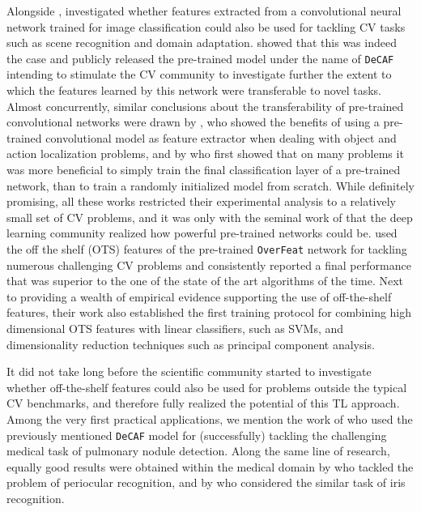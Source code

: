 Alongside \citet{yosinski2014transferable}, \citet{donahue2014decaf} investigated whether features extracted from a convolutional neural network trained for image classification could also be used for tackling CV tasks such as scene recognition and domain adaptation. \citet{donahue2014decaf} showed that this was indeed the case and publicly released the pre-trained model under the name of \texttt{DeCAF} intending to stimulate the CV community to investigate further the extent to which the features learned by this network were transferable to novel tasks. Almost concurrently, similar conclusions about the transferability of pre-trained convolutional networks were drawn by \citet{oquab2014learning}, who showed the benefits of using a pre-trained convolutional model as feature extractor when dealing with object and action localization problems, and by \citet{zeiler2014visualizing} who first showed that on many problems it was more beneficial to simply train the final classification layer of a pre-trained network, than to train a randomly initialized model from scratch. While definitely promising, all these works restricted their experimental analysis to a relatively small set of CV problems, and it was only with the seminal work of \citet{sharif2014cnn} that the deep learning community realized how powerful pre-trained networks could be. \citet{sharif2014cnn} used the off the shelf (OTS) features of the pre-trained \texttt{OverFeat} network \cite{sermanet2013overfeat} for tackling numerous challenging CV problems and consistently reported a final performance that was superior to the one of the state of the art algorithms of the time. Next to providing a wealth of empirical evidence supporting the use of off-the-shelf features, their work also established the first training protocol for combining high dimensional OTS features with linear classifiers, such as SVMs, and dimensionality reduction techniques such as principal component analysis. 

It did not take long before the scientific community started to investigate whether off-the-shelf features could also be used for problems outside the typical CV benchmarks, and therefore fully realized the potential of this TL approach. Among the very first practical applications, we mention the work of \citet{van2015off} who used the previously mentioned \texttt{DeCAF} model for (successfully) tackling the challenging medical task of pulmonary nodule detection. Along the same line of research, equally good results were obtained within the medical domain by \citet{hernandez2018periocular} who tackled the problem of periocular recognition, and by \citet{nguyen2017iris} who considered the similar task of iris recognition.

